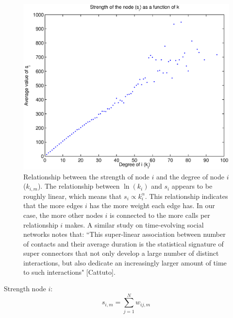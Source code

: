 \documentclass[12pt]{article}
\begin{document}
\begin{figure}[H]
\includegraphics[width = 1\textwidth]{Graficos/svsk.eps}
\caption{Relationship between the strength of node \(i\) and the degree of node \(i\) (\(k_{i,m}\)). The relationship between \(\ln{(k_i)}\) and \(s_i\) appears to be roughly linear, which means that \(s_i \propto k_i^\alpha\). This relationship indicates that the more edges \(i\) has the more weight each edge has. In our case, the more other nodes \(i\) is connected to the more calls per relationship \(i\) makes. \newline A similar study on time-evolving social networks notes that: \newline ``This super-linear association between number of contacts and their average duration is the statistical signature of super connectors that not only develop a large number of distinct interactions, but also dedicate an increasingly larger amount of time to such interactions" [Cattuto].}
\label{fig:svsk}
\end{figure}

Strength node \(i\):
\begin{equation}
s_{i,m} = \sum_{j=1}^N w_{ij,m}
\end{equation}
\end{document}
